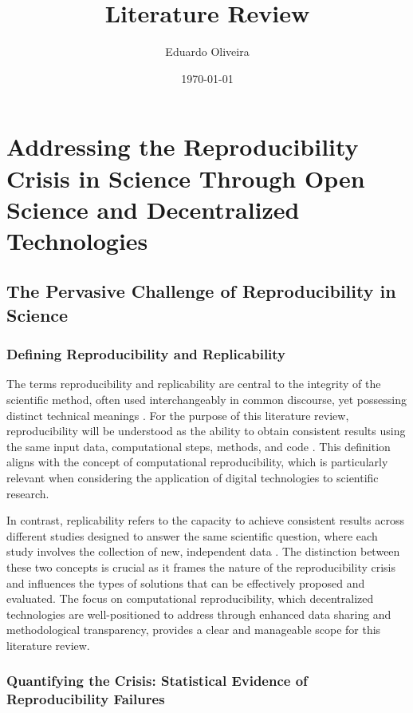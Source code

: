 \documentclass{article}
\title{Literature Review}
\author{Eduardo Oliveira}
\date{\today}
\begin{document}
\maketitle


\section{Addressing the Reproducibility Crisis in Science Through Open Science and Decentralized Technologies}

\subsection{The Pervasive Challenge of Reproducibility in Science}

\subsubsection{Defining Reproducibility and Replicability}

The terms reproducibility and replicability are central to the integrity of the scientific method, often used interchangeably in common discourse, yet possessing distinct technical meanings \cite{national2019reproducibility}. For the purpose of this literature review, reproducibility will be understood as the ability to obtain consistent results using the same input data, computational steps, methods, and code \cite{stodden2016enhancing}. This definition aligns with the concept of computational reproducibility, which is particularly relevant when considering the application of digital technologies to scientific research.

In contrast, replicability refers to the capacity to achieve consistent results across different studies designed to answer the same scientific question, where each study involves the collection of new, independent data \cite{baker2016reproducibility}. The distinction between these two concepts is crucial as it frames the nature of the reproducibility crisis and influences the types of solutions that can be effectively proposed and evaluated. The focus on computational reproducibility, which decentralized technologies are well-positioned to address through enhanced data sharing and methodological transparency, provides a clear and manageable scope for this literature review.

\subsubsection{Quantifying the Crisis: Statistical Evidence of Reproducibility Failures}
\end{document}

